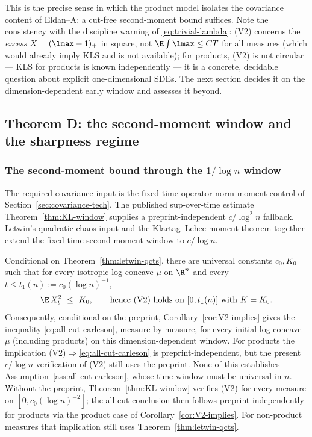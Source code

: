 \documentclass[../../main.tex]{subfiles}
\begin{document}
\begin{remark}
This is the precise sense in which the product model isolates the covariance content of
Eldan--A: a cut-free second-moment bound suffices. Note the consistency with the discipline
warning of \eqref{eq:trivial-lambda}: (V2) concerns the \emph{excess} $X=(\lmax-1)_+$ in square,
not $\E\int\lmax\le CT$ for all measures (which would already imply KLS and is not available);
for products, (V2) is not circular --- KLS for products is known independently --- it is a
concrete, decidable question about explicit one-dimensional SDEs. The next section decides it
on the dimension-dependent early window and assesses it beyond.
\end{remark}

\subsection{Theorem D: the second-moment window and the sharpness regime}
\label{sec:window}

\subsubsection{\texorpdfstring{The second-moment bound through the $1/\log n$ window}{The
second-moment bound through the 1/log n window}}

The required covariance input is the fixed-time operator-norm moment control of
Section~\ref{sec:covariance-tech}. The published sup-over-time estimate
Theorem~\ref{thm:KL-window} supplies a preprint-independent $c/\log^2n$ fallback. Letwin's
quadratic-chaos input and the Klartag--Lehec moment theorem together extend the fixed-time
second-moment window to $c/\log n$.

\begin{theorem}
\label{thm:V2-window}
Conditional on Theorem~\ref{thm:letwin-qcts}, there are universal constants $c_0,K_0$ such that
for every isotropic log-concave $\mu$ on $\R^n$ and every
$t\le t_1(n):=c_0(\log n)^{-1}$,
\[
  \E\,X_t^2\ \le\ K_0 ,
  \qquad\text{hence \textup{(V2)} holds on }[0,t_1(n)]\text{ with }K=K_0 .
\]
Consequently, conditional on the preprint, Corollary~\textup{\ref{cor:V2-implies}} gives the
inequality \eqref{eq:all-cut-carleson}, measure by measure, for every initial log-concave $\mu$
(including products) on this dimension-dependent window. For products the implication
\textup{(V2)}$\Rightarrow$\eqref{eq:all-cut-carleson} is preprint-independent, but the present
$c/\log n$ verification of \textup{(V2)} still uses the preprint. None of this establishes
Assumption~\ref{ass:all-cut-carleson}, whose time window must be universal in $n$. Without the
preprint, Theorem~\ref{thm:KL-window} verifies \textup{(V2)} for every measure on
$[0,c_0(\log n)^{-2}]$; the all-cut conclusion then follows preprint-independently for products
via the product case of Corollary~\ref{cor:V2-implies}. For non-product measures that implication
still uses Theorem~\ref{thm:letwin-qcts}.
\end{theorem}
\end{document}
